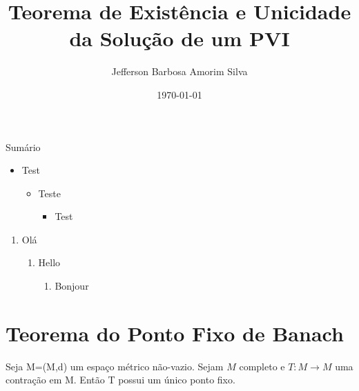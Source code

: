 \documentclass[10pt]{beamer}
\begin{document}
	\title[Ponto Fixo]{Teorema de Existência e Unicidade da Solução de um PVI}
	\subtitle{}
	\author[Jefferson Silva]{Jefferson Barbosa Amorim Silva}
	\date{\today}
	\frame{\maketitle}
	\begin{frame}{Sumário}
		\tableofcontents
	\end{frame}
	\begin{frame}
		\begin{itemize}
			\item Test
			\begin{itemize}
				\item Teste
				\begin{itemize}
					\item Test
				\end{itemize}
			\end{itemize}
		\end{itemize}
		\begin{enumerate}
			\item Olá
			\begin{enumerate}
				\item  Hello
				\begin{enumerate}
					\item Bonjour
				\end{enumerate}
			\end{enumerate}
		\end{enumerate}
	\end{frame}
	\section{Teorema do Ponto Fixo de Banach}
	\begin{frame}
		\begin{theorem}
			Seja M=(M,d) um espaço métrico não-vazio. Sejam $M$ completo e $T:M\rightarrow{M}$ uma contração em M. Então T possui um único ponto fixo.
		\end{theorem}
	\end{frame}
\end{document}
